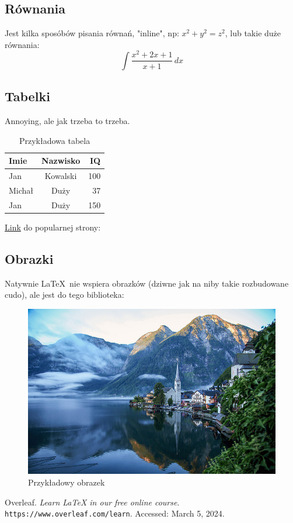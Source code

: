 \documentclass{article}
\begin{document}
\subsection{Równania}
Jest kilka sposóbów pisania równań, "inline", np: \(x^2 + y^2 = z^2\), lub takie duże równania:
\begin{equation}
    \int \frac{x^2 + 2x + 1}{x + 1} \, dx
\end{equation}

\subsection{Tabelki}
Annoying, ale jak trzeba to trzeba.
\begin{table}[htb]
    \centering
    \begin{tabular}{|l|c|r|}
    \hline
    Imie   & Nazwisko & IQ  \\ \hline
    Jan    & Kowalski & 100 \\ \hline
    Michał & Duży     & 37  \\ \hline
    Jan    & Duży     & 150 \\ \hline
    \end{tabular}
    \caption{Przykładowa tabela}
    \end{table}

\href{https://www.google.com}{Link} do popularnej strony: 

\subsection{Obrazki}
Natywnie \LaTeX\ nie wspiera obrazków (dziwne jak na niby takie rozbudowane cudo), ale jest do tego biblioteka:

\begin{figure}[htb]
    \centering
    \includegraphics[scale=0.45]{pretty_picture}
    \caption{Przykładowy obrazek}
\end{figure}
\newpage


\begin{thebibliography}{9}
    Overleaf.
    \textit{Learn LaTeX in our free online course}.
    \verb|https://www.overleaf.com/learn|.
    Accessed: March 5, 2024.
\end{thebibliography}
\end{document}
